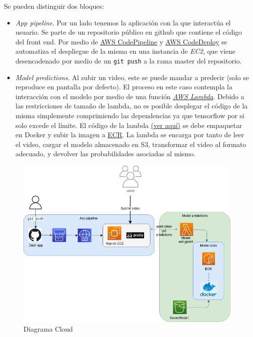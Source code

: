 Se pueden distinguir dos bloques:
%
\begin{itemize}%
%
\item \textit{App pipeline}.
Por un lado tenemos la aplicación con la que interactúa el usuario.
Se parte de un repositorio público en github que contiene el código del front end. Por medio de \href{https://aws.amazon.com/es/codepipeline/}{AWS CodePipeline} y \href{https://aws.amazon.com/es/codedeploy/}{AWS CodeDeploy} se automatiza el despliegue de la misma en una instancia de \textit{EC2}, que viene desencadenado por medio de un \texttt{git push} a la rama master del repositorio.

\item \textit{Model predictions}.
Al subir un video, este se puede mandar a predecir (solo se reproduce en pantalla por defecto). El proceso en este caso contempla la interacción con el modelo por medio de una función \href{https://aws.amazon.com/es/lambda/}{\textit{AWS Lambda}}. Debido a las restricciones de tamaño de lambda, no es posible desplegar el código de la misma simplemente comprimiendo las dependencias ya que tensorflow por si solo excede el límite. El código de la lambda \href{https://github.com/plaguss/tfm-misc/tree/main/lambda_aws}{(ver aquí)} se debe empaquetar en Docker y subir la imagen a \href{https://aws.amazon.com/es/ecr/}{ECR}. La lambda se encarga por tanto de leer el video, cargar el modelo almacenado en S3, transformar el video al formato adecuado, y devolver las probabilidades asociadas al mismo.

\end{itemize}


\begin{figure}[H]
    \centering
		\includegraphics[width=\textwidth]{figs/cloud_diagram.png}
\caption{Diagrama Cloud}\label{cloud_diagram}


\end{figure}

